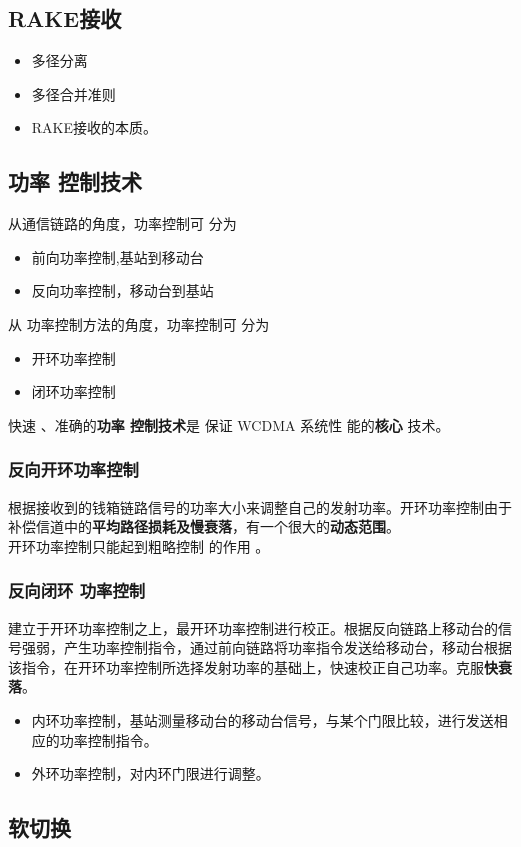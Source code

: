 \subsection{RAKE接收}
\begin{itemize}
	\item 多径分离
	\item 多径合并准则
	\item  RAKE接收的本质。
\end{itemize}
\subsection{功率 控制技术}
从通信链路的角度，功率控制可 分为
\begin{itemize}
	\item 前向功率控制,基站到移动台
	\item 反向功率控制，移动台到基站
\end{itemize}
从 功率控制方法的角度，功率控制可 分为
\begin{itemize}
	\item 开环功率控制
	\item 闭环功率控制
\end{itemize}
快速 、准确的\textbf{功率 控制技术}是 保证 WCDMA 系统性
能的\textbf{核心 }技术。
\subsubsection{反向开环功率控制}
根据接收到的钱箱链路信号的功率大小来调整自己的发射功率。开环功率控制由于补偿信道中的\textbf{平均路径损耗及慢衰落}，有一个很大的\textbf{动态范围}。\\
开环功率控制只能起到粗略控制
的作用 。
\subsubsection{反向闭环 功率控制}
建立于开环功率控制之上，最开环功率控制进行校正。根据反向链路上移动台的信号强弱，产生功率控制指令，通过前向链路将功率指令发送给移动台，移动台根据该指令，在开环功率控制所选择发射功率的基础上，快速校正自己功率。克服\textbf{快衰落}。
\begin{itemize}
	\item 内环功率控制，基站测量移动台的移动台信号，与某个门限比较，进行发送相应的功率控制指令。
	\item 外环功率控制，对内环门限进行调整。
\end{itemize}
\subsection{软切换}










